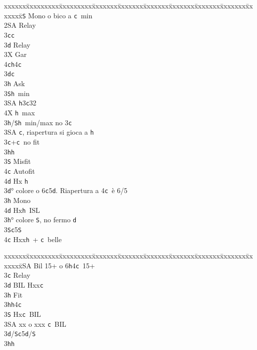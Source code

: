 \documentclass[a4paper,italian]{article}
\newcommand{\BS}{\small{\texttt{S}}}
\newcommand{\BC}{\small{\texttt{c}}}
\newcommand{\BD}{\small{\texttt{d}}}
\newcommand{\BH}{\small{\texttt{h}}}
\newenvironment{bidtable}
{\begin{tabbing}

    xxxxxx\=xxxxxxxxx\=xxxxxxxxx\=xxxxxxx\=xxxxxxx\=xxxxxxx\=xxxxxxx\=xxxxxxx\=xxxxxxx\=xxxxxxx\=\kill}
{\end{tabbing} }%
\begin{document}
\begin{multicols}{2}
    \columnbreak
    \begin{bidtable}
        2\BS \> Mono o bico a \BC\ min\+\\
        2\small{SA} \> Relay\+\\
        3\BC {}\BC \+\\
        3\BD \> Relay\+\\
        3X \> Gar\\
        4\BC {}\BH 4\BC \-\-\\
        3\BD {}\BC \+\\
        3\BH \> Ask\+\\
        3\BS {}\BH\ min\\
        3\small{SA} \BH 3\BC 32\\
        4X \BH\ max\-\-\\
        3\BH/\BS {}\BH\ min/max no 3\BC \\
        3\small{SA} \BC , riapertura si gioca a \BH \-\\
        3\BC {}+\BC\ no fit\+\\
        3\BH {}\BH \+\\
        3\BS \> Misfit\\
        4\BC \> Autofit\\
        4\BD \> Hx \BH \-\-\\
        3\BD {}° colore o 6\BC 5\BD . Riapertura a 4\BC\ è 6/5\+\\
        3\BH \> Mono\+\\
        4\BD \> Hx\BH\ ISL\-\-\\
        3\BH {}° colore \BS, no fermo \BD\\
        3\BS {}\BC 5\BS \\
        4\BC \> Hxx\BH\ + \BC\ belle\-\\
    \end{bidtable}
    \columnbreak
    \begin{bidtable}
        2\small{SA} \> Bil 15+ o 6\BH 4\BC\ 15+\+\\
        3\BC \> Relay\+\\
        3\BD \> BIL Hxx\BC \+\\
        3\BH \> Fit\-\\
        3\BH {}\BH 4\BC \\
        3\BS \> Hx\BC\ BIL\\
        3\small{SA} \> xx o xxx \BC\ BIL\-\\
        3\BD/\BS {}\BC 5\BD /\BS \\
        3\BH {}\BH \-\\

\end{bidtable}
\end{multicols}
\end{document}

